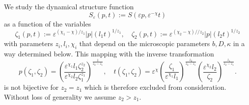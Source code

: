 \documentclass[12pt]{article}
\begin{document}
We study the dynamical structure function 
\begin{equation}
S_{\varepsilon}(p,t) := S(\varepsilon p, \varepsilon^{-\chi} t)
\end{equation}
as a function of the variables
\begin{equation}
\zeta_1(p,t) := \varepsilon^{(\chi_1-\chi)/z_1} |p| (l_1 t)^{1/z_1}, \quad 
\zeta_2(p,t) := \varepsilon^{(\chi_2-\chi)//z_2} |p| (l_2 t)^{1/z_2}
\label{zetadef}
\end{equation}
with parameters $z_i,l_i,\chi_i$ that depend on the microscopic
parameters $b,D,\kappa$ in a way determined below.
This mapping with the inverse transformation
\begin{equation}
p(\zeta_1,\zeta_2)
= 
\left(\frac{\varepsilon^{\chi_1} l_1 \zeta_2^{z_2}}
{\varepsilon^{\chi_2} l_2 \zeta_1^{z_1}}\right)^{\frac{1}{z_2-z_1}} 
, \quad t(\zeta_1,\zeta_2) = \varepsilon^{\chi}
\left(
\frac{\zeta_1}{\varepsilon^{\chi_1}l_1}
\right)^{\frac{z_2}{z_2-z_1}}
\left(\frac{\varepsilon^{\chi_2}l_2}{\zeta_2} \right)^{\frac{z_1}{z_2-z_1}} .
\label{zetainv}
\end{equation}
is not bijective for $z_2=z_1$ which is therefore excluded
from consideration. Without loss of generality we assume 
$z_2>z_1$.
\end{document}
